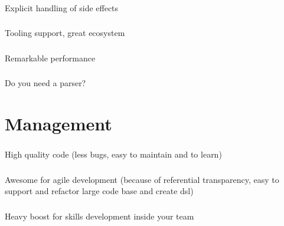 \documentclass[usenames,dvipsnames, 18pt, compress, aspectratio=169]{beamer}
\begin{document}
\begin{frame}
    \frametitle{}
    \begin{center}
    Explicit handling of side effects
    \end{center}
\end{frame}

\begin{frame}
    \frametitle{}
    \begin{center}
    Tooling support, great ecosystem
    \end{center}
\end{frame}

\begin{frame}
    \frametitle{}
    \begin{center}
    Remarkable performance
    \end{center}
\end{frame}

\begin{frame}
    \frametitle{}
    \begin{center}
    Do you need a parser?
    \end{center}
\end{frame}

\fontsize{13pt}{14}\selectfont
\section{Management}
\fontsize{17pt}{18}\selectfont

\begin{frame}
    \frametitle{}
    \begin{center}
    High quality code (less bugs, easy to maintain and to learn)
    \end{center}
\end{frame}

\begin{frame}
    \frametitle{}
    \begin{center}
    Awesome for agile development (because of referential transparency, easy to
    support and refactor large code base and create dsl)
    \end{center}
\end{frame}

\begin{frame}
    \frametitle{}
    \begin{center}
    Heavy boost for skills development inside your team
    \end{center}
\end{frame}
\end{document}
